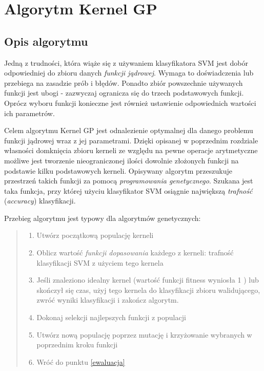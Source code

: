 \chapter{Algorytm Kernel GP}
\label{ch:alg}
\section{Opis algorytmu}
Jedną z trudności, która wiąże się z używaniem klasyfikatora SVM jest dobór odpowiedniej do zbioru danych \textit{funkcji jądrowej}. Wymaga to doświadczenia lub przebiega na zasadzie prób i błędów. Ponadto zbiór powszechnie używanych funkcji jest ubogi - zazwyczaj ogranicza się do trzech podstawowych funkcji. Oprócz wyboru funkcji konieczne jest również ustawienie odpowiednich wartości ich parametrów.

Celem algorytmu Kernel GP jest odnalezienie optymalnej dla danego problemu funkcji jądrowej wraz z jej parametrami. Dzięki opisanej w poprzednim rozdziale własności domknięcia zbioru kerneli ze względu na pewne operacje arytmetyczne możliwe jest tworzenie nieograniczonej ilości dowolnie złożonych funkcji na podstawie kilku podstawowych kerneli. Opisywany algorytm przeszukuje przestrzeń takich funkcji za pomocą \textit{programowania genetycznego}. Szukana jest taka funkcja, przy której użyciu klasyfikator SVM osiągnie największą \textit{trafność} (\textit{accuracy}) klasyfikacji.


Przebieg algorytmu jest typowy dla algorytmów genetycznych:
\begin{quote}
\begin{enumerate}
\item Utwórz początkową populację kerneli
\item \label{ewaluacja} Oblicz wartość \textit{funkcji dopasowania} każdego z kerneli: trafność klasyfikacji SVM z użyciem tego kernela
\item Jeśli znaleziono idealny kernel (wartość funkcji fitness wyniosła 1 ) lub skończył się czas, użyj tego kernela do klasyfikacji zbioru walidującego, zwróć wyniki klasyfikacji i zakończ algorytm.
\item Dokonaj selekcji najlepszych funkcji z populacji
\item Utwórz nową populację poprzez mutację i krzyżowanie wybranych w poprzednim kroku funkcji
\item Wróć do punktu \ref{ewaluacja}
\end{enumerate}
\end{quote}


